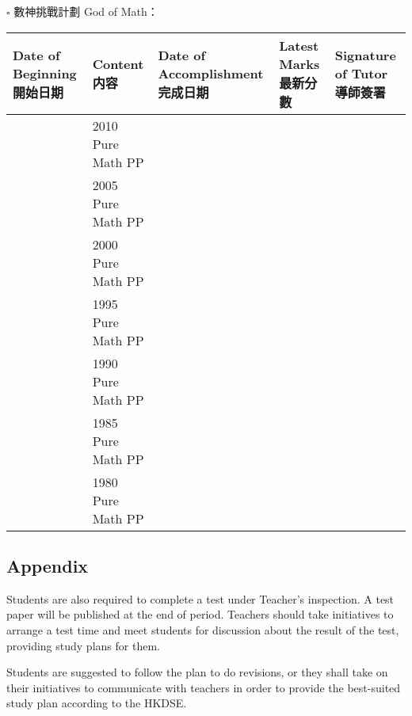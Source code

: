 \documentclass{article}
\begin{document}
    

    $\square$ 數神挑戰計劃 God of Math：
    \begin{center}
        \begin{tabular}{|m{3cm}|m{5cm}|m{4cm}|m{2cm}|m{2cm}|}
            \hline
            Date of Beginning 開始日期&Content 内容&Date of Accomplishment 完成日期&Latest Marks 最新分數&Signature of Tutor 導師簽署\\
            \hline
            &2010 Pure Math PP&&&\\
            \hline
            &2005 Pure Math PP&&&\\
            \hline
            &2000 Pure Math PP&&&\\
            \hline
            &1995 Pure Math PP&&&\\
            \hline
            &1990 Pure Math PP&&&\\
            \hline
            &1985 Pure Math PP&&&\\
            \hline
            &1980 Pure Math PP&&&\\
            \hline
        \end{tabular}
    \end{center}

    \subsection*{Appendix}

    Students are also required to complete a test under Teacher's inspection. A test paper will be published at the end of period. Teachers should take initiatives to arrange a test time and meet students for discussion about the result of the test, providing study plans for them.

    Students are suggested to follow the plan to do revisions, or they shall take on their initiatives to communicate with teachers in order to provide the best-suited study plan according to the HKDSE.
\end{document}
